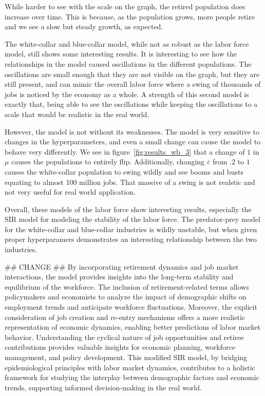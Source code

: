 \documentclass[11pt]{amsart}
\begin{document}
While harder to see with the scale on the graph, the retired population does increase over time. 
This is because, as the population grows, more people retire and we see a slow but steady growth, as expected.

The white-collar and blue-collar model, while not as robust as the labor force model, still shows some interesting results. It is interesting to see how the relationships in the model
caused oscillations in the different populations. The oscillations are small enough that they are not visible on the graph, but they are still present, and can mimic the overall 
labor force where a swing of thousands of jobs is noticed by the economy as a whole. A strength of this second model is exactly that, being able to see the oscillations while
keeping the oscillations to a scale that would be realistic in the real world.

However, the model is not without its weaknesses. The model is very sensitive to changes in the hyperparameters, and even a small change can cause the model to behave very differently. We see
in figure~\ref{fig:results_wb_3} that a change of $1$ in $\mu$ causes the populations to entirely flip. Additionally, changing $\varepsilon$ from $.2$ to $1$ causes 
the white-collar population to swing wildly and see booms and busts equating to almost 100 million jobs. That massive of a swing is not realstic and not very useful for real world application.

Overall, these models of the labor force show interesting results, especially the SIR model for modeling the stability of the labor force. The predator-prey model for the white-collar and blue-collar
industries is wildly unstable, but when given proper hyperparamers demonstrates an interesting relationship between the two industries.

## CHANGE ##
By incorporating retirement dynamics and job market interactions, the model provides insights into the long-term stability and equilibrium of the workforce. 
The inclusion of retirement-related terms allows policymakers and economists to analyze the impact of demographic shifts on employment trends and anticipate 
workforce fluctuations. Moreover, the explicit consideration of job creation and re-entry mechanisms offers a more realistic representation of economic dynamics, 
enabling better predictions of labor market behavior. Understanding the cyclical nature of job opportunities and retiree contributions provides valuable insights 
for economic planning, workforce management, and policy development. This modified SIR model, by bridging epidemiological principles with labor market dynamics, 
contributes to a holistic framework for studying the interplay between demographic factors and economic trends, supporting informed decision-making in the real world.



\newpage 


\end{document}
